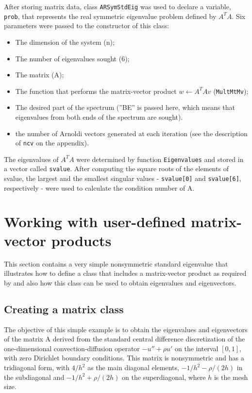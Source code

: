 After storing matrix data, class \texttt{ARSymStdEig} was used to declare a variable, \texttt{prob}, that represents the real symmetric eigenvalue problem defined by $A^{T}A$. Six parameters were passed to the constructor of this class:
\begin{itemize}
	\item The dimension of the system (n);
	\item The number of eigenvalues sought (6);
	\item The matrix (A);
	\item The function that performs the matrix-vector product $w\leftarrow A^{T}Av$ (\texttt{MultMtMv});
	\item The desired part of the spectrum (”BE” is passed here, which means that eigenvalues from both ends of the spectrum are sought).
	\item the number of Arnoldi vectors generated at each iteration (see the description of \texttt{ncv} on the appendix).
\end{itemize}

The eigenvalues of $A^{T}A$ were determined by function \texttt{Eigenvalues} and stored in a vector called \texttt{svalue}. After computing the square roots of the elements of svalue, the largest and the smallest singular values - \texttt{svalue[0]} and \texttt{svalue[6]}, respectively - were used to calculate the condition number of A.

\section{Working with user-defined matrix-vector products}

This section contains a very simple nonsymmetric standard eigenvalue that illustrates how to define a class that includes a matrix-vector product as required by \ARPP{} and also how this class can be used to obtain eigenvalues and eigenvectors.

\subsection{Creating a matrix class}

The objective of this simple example is to obtain the eigenvalues and eigenvectors of the matrix A derived from the standard central difference discretization of the one-dimensional convection-diffusion operator $-u'' + \rho u'$ on the interval $[0,1]$, with zero Dirichlet boundary conditions. This matrix is nonsymmetric and has a tridiagonal form, with $4/h^2$ as the main diagonal elements, $-1/h^2-\rho/(2h)$ in the subdiagonal and $-1/h^2+\rho/(2h)$ on the superdiagonal, where $h$ is the mesh size. 

